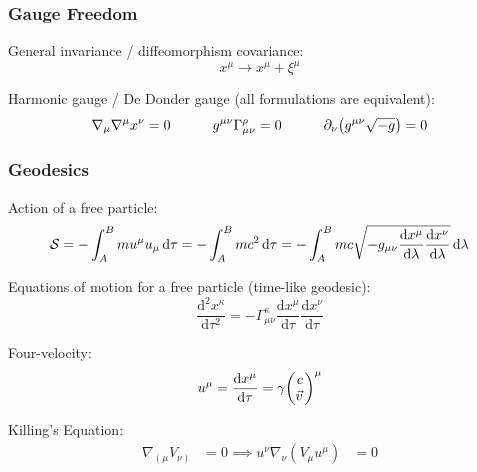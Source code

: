 		\subsubsection{Gauge Freedom}
			General invariance / diffeomorphism covariance:
			\begin{equation}
				x^\mu \to x^\mu + \xi^\mu
			\end{equation}

			\noindent
			Harmonic gauge / De Donder gauge (all formulations are equivalent):
			\begin{equation}
				\nabla_\mu \nabla^\mu x^\nu = 0
				\hspace{30pt} g^{\mu\nu} \Gamma^\rho_{\mu\nu} = 0
				\hspace{30pt} \partial_\nu \qty(g^{\mu\nu}\sqrt{-g}) = 0
			\end{equation}

		\subsubsection{Geodesics}
			\noindent
			Action of a free particle:
			\begin{equation}
				\mathcal{S}
				= -\int_A^B m u^\mu u_\mu \dd{\tau}
				= -\int_A^B mc^2\dd{\tau}
				= -\int_A^B mc\sqrt{-g_{\mu\nu} \dv{x^\mu}{\lambda} \dv{x^\nu}{\lambda}} \dd{\lambda}
			\end{equation}

			\noindent
			Equations of motion for a free particle (time-like geodesic):
			\begin{equation}
				\frac{\mathrm{d}^2 x^\kappa}{\mathrm{d}\tau^2}=-\Gamma_{\mu\nu}^{\kappa}\frac{\mathrm{d}x^\mu}{\mathrm{d}\tau}\frac{\mathrm{d}x^\nu}{\mathrm{d}\tau}
			\end{equation}

			\noindent
			Four-velocity:
			\begin{equation}
				u^\mu = \dv{x^\mu}{\tau} = \gamma \mqty(c \\ \vec{v})^\mu
			\end{equation}

			\noindent
			Killing's Equation:
			\begin{equation}
				\begin{aligned}
					\nabla_{\left(\mu\right.} V_{\left.\nu\right)} &= 0
					\implies u^\nu \nabla_\nu (V_\mu u^\mu) &= 0
				\end{aligned}
			\end{equation}

